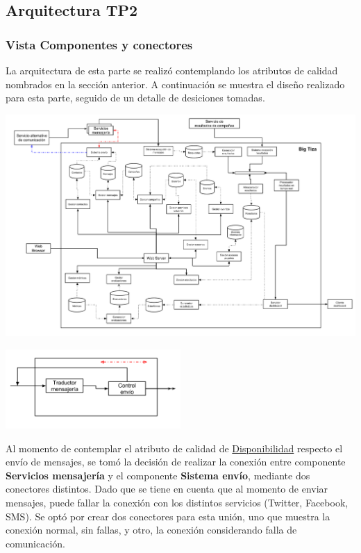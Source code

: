 \documentclass[a4paper, 11pt]{article}
\begin{document}
\newpage
\subsection{Arquitectura TP2}
\subsubsection{Vista Componentes y conectores}
La arquitectura de esta parte se realizó contemplando los atributos de calidad nombrados en la sección anterior. A continuación se muestra el diseño realizado para esta parte, seguido de un detalle de desiciones tomadas.

\centerline{\includegraphics[width=1.2\textwidth]{./diagramas/VistaCompyCon.png}}
\centerline{\includegraphics[width=0.5\textwidth]{./diagramas/ArqTP2Envio.png}}

Al momento de contemplar el atributo de calidad de \underline{Disponibilidad} respecto el envío de mensajes, se tomó la decisión de realizar la conexión entre componente \textbf{Servicios mensajería} y el componente \textbf{Sistema envío}, mediante dos conectores distintos. Dado que se tiene en cuenta que al momento de enviar mensajes, puede fallar la conexión con los distintos servicios (Twitter, Facebook, SMS). 
Se optó por crear dos conectores para esta unión, uno que muestra la conexión normal, sin fallas, y otro, la conexión considerando falla de comunicación.\\
\end{document}
